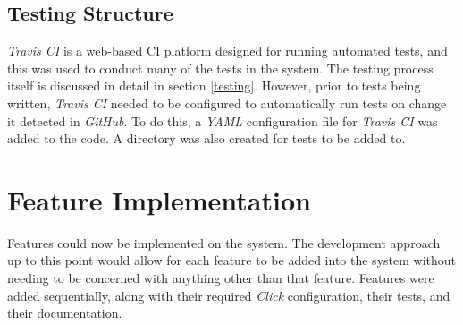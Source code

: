 \subsection{Testing Structure}
\label{testing_structure}
\textit{Travis CI} \cite{travis_ci} is a web-based CI platform designed for running automated tests, and this was used to conduct many of the tests in the system.
The testing process itself is discussed in detail in section \ref{testing}.
However, prior to tests being written, \textit{Travis CI} needed to be configured to automatically run tests on change it detected in \textit{GitHub}.
To do this, a \textit{YAML} configuration file for \textit{Travis CI} was added to the code.
A directory was also created for tests to be added to.

\section{Feature Implementation}
\label{features}
Features could now be implemented on the system.
The development approach up to this point would allow for each feature to be added into the system without needing to be concerned with anything other than that feature.
Features were added sequentially, along with their required \textit{Click} configuration, their tests, and their documentation.

